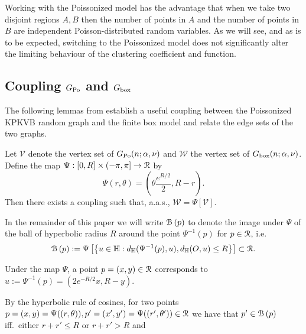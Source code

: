 Working with the Poissonized model has the advantage that when we take two disjoint regions $A, B$ then the number of points in $A$ and the number of points  in $B$ are independent Poisson-distributed random variables. As we will see, and as is to be expected, switching to the Poissonized model does not significantly alter the limiting behaviour of the clustering coefficient and function.


\subsection{Coupling $G_{\text{Po}}$ and $G_{\text{box}}$\label{ssec:coupling_H_P}}


The following lemmas from \cite{fountoulakis2018law} establish a useful coupling between the Poissonized KPKVB random graph
and the finite box model and relate the edge  sets of the two graphs. 

\begin{lemma}\label{lem:coupling_hyperbolic_poisson}
Let $\mathcal{V}$ denote the vertex set of $G_{\text{Po}}(n;\alpha, \nu)$ and $\mathcal{W}$ the vertex set of $G_{\text{box}}(n;\alpha, \nu)$. 
Define the map $\Psi : [0,R] \times (-\pi, \pi] \to {\mathcal R}$ by
\begin{equation}\label{eq:def_Psi}
	\Psi(r,\theta) = \left(\theta \frac{e^{R/2}}{2}, R - r\right).
\end{equation}
Then there exists a coupling such that, a.a.s., $\mathcal{W} = \Psi[\mathcal{V}]$. %
\end{lemma}

In the remainder of this paper we will write ${\mathcal B}\left(p\right)$ to denote the image under $\Psi$ of the ball of hyperbolic radius $R$ around the point 
$\Psi^{-1}(p)$ for $p \in {\mathcal R}$, i.e. 
\[
	{\mathcal B}\left(p\right) := 
	\Psi\left[ \left\{ u \in {\mathbb H} : 
	d_{\mathbb{H}}(\Psi^{-1}(p),u), d_{\mathbb{H}}(O,u) \le R \right\}\right] \subset {\mathcal R}.
\]

Under the map $\Psi$, a point $p = (x,y) \in {\mathcal R}$ corresponds to $u := \Psi^{-1}(p) = (2 e^{-R/2} x, R - y)$. 

By the hyperbolic rule of cosines, for two points $p = (x,y) = \Psi( (r,\theta) ), p' = (x',y') = \Psi( (r',\theta') ) \in {\mathcal R}$ we have that
$p' \in {\mathcal B}\left(p\right)$ iff.~either $r+r'\leq R$ or $r+r'>R$ and

